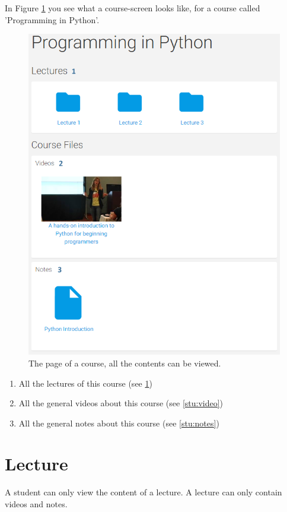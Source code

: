 \documentclass[a4paper,11pt]{report}
\begin{document}
In Figure \ref{fig:stu_course} you see what a course-screen looks like, for a course called 'Programming in Python'.
\begin{figure}[H]
\centering
\includegraphics[scale=0.55]{imgs/stu_course.png}
\caption{The page of a course, all the contents can be viewed.}
\label{fig:stu_course}
\end{figure}
\begin{enumerate}
\item All the lectures of this course (see \ref{stu:lecture})
\item All the general videos about this course (see \ref{stu:video})
\item All the general notes about this course (see \ref{stu:notes})
\end{enumerate}


\section{Lecture}
\label{stu:lecture}
A student can only view the content of a lecture. A lecture can only contain videos and notes.
\end{document}
